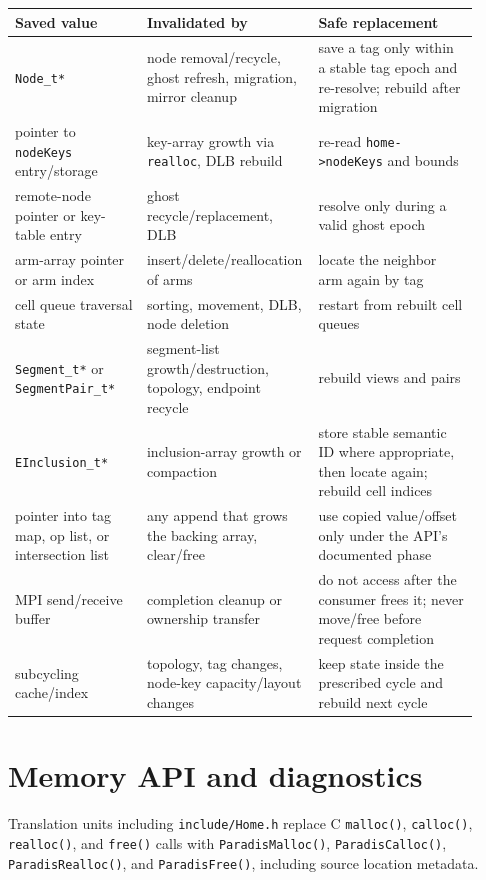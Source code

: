 \documentclass[11pt]{article}
\newcommand{\code}[1]{\texorpdfstring{\nolinkurl{#1}}{#1}}
\newcommand{\srcfile}[1]{\texorpdfstring{\nolinkurl{#1}}{#1}}
\begin{document}
\begin{longtable}{@{}p{0.29\linewidth}p{0.29\linewidth}p{0.34\linewidth}@{}}
\toprule
Saved value & Invalidated by & Safe replacement \\
\midrule
\endhead
\code{Node_t*} & node removal/recycle, ghost refresh, migration, mirror cleanup
& save a tag only within a stable tag epoch and re-resolve; rebuild after
migration \\
pointer to \code{nodeKeys} entry/storage & key-array growth via
\code{realloc}, DLB rebuild & re-read \code{home->nodeKeys} and bounds \\
remote-node pointer or key-table entry & ghost recycle/replacement, DLB &
resolve only during a valid ghost epoch \\
arm-array pointer or arm index & insert/delete/reallocation of arms & locate
the neighbor arm again by tag \\
cell queue traversal state & sorting, movement, DLB, node deletion & restart
from rebuilt cell queues \\
\code{Segment_t*} or \code{SegmentPair_t*} & segment-list growth/destruction,
topology, endpoint recycle & rebuild views and pairs \\
\code{EInclusion_t*} & inclusion-array growth or compaction & store stable
semantic ID where appropriate, then locate again; rebuild cell indices \\
pointer into tag map, op list, or intersection list & any append that grows
the backing array, clear/free & use copied value/offset only under the API's
documented phase \\
MPI send/receive buffer & completion cleanup or ownership transfer & do not
access after the consumer frees it; never move/free before request completion \\
subcycling cache/index & topology, tag changes, node-key capacity/layout
changes & keep state inside the prescribed cycle and rebuild next cycle \\
\bottomrule
\end{longtable}

\section{Memory API and diagnostics}

Translation units including \srcfile{include/Home.h} replace C
\code{malloc()}, \code{calloc()}, \code{realloc()}, and \code{free()} calls
with \code{ParadisMalloc()}, \code{ParadisCalloc()},
\code{ParadisRealloc()}, and \code{ParadisFree()}, including source location
metadata.
\end{document}
